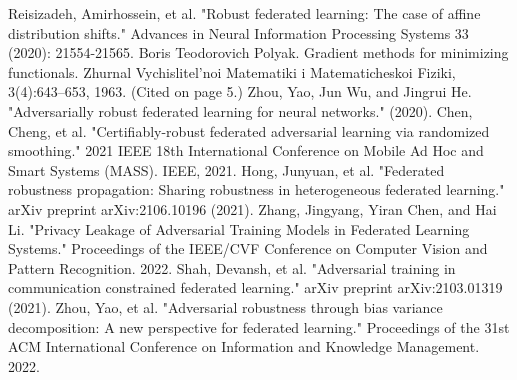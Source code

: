 \documentclass[conference]{IEEEtran}
\begin{document}
\begin{thebibliography}{00}
     Reisizadeh, Amirhossein, et al. "Robust federated learning: The case of affine distribution shifts." Advances in Neural Information Processing Systems 33 (2020): 21554-21565.
     Boris Teodorovich Polyak. Gradient methods for minimizing functionals. Zhurnal Vychislitel'noi Matematiki i Matematicheskoi Fiziki, 3(4):643–653, 1963. (Cited on page 5.)
     Zhou, Yao, Jun Wu, and Jingrui He. "Adversarially robust federated learning for neural networks." (2020).
     Chen, Cheng, et al. "Certifiably-robust federated adversarial learning via randomized smoothing." 2021 IEEE 18th International Conference on Mobile Ad Hoc and Smart Systems (MASS). IEEE, 2021.
     Hong, Junyuan, et al. "Federated robustness propagation: Sharing robustness in heterogeneous federated learning." arXiv preprint arXiv:2106.10196 (2021).
     Zhang, Jingyang, Yiran Chen, and Hai Li. "Privacy Leakage of Adversarial Training Models in Federated Learning Systems." Proceedings of the IEEE/CVF Conference on Computer Vision and Pattern Recognition. 2022.  
     Shah, Devansh, et al. "Adversarial training in communication constrained federated learning." arXiv preprint arXiv:2103.01319 (2021). 
     Zhou, Yao, et al. "Adversarial robustness through bias variance decomposition: A new perspective for federated learning." Proceedings of the 31st ACM International Conference on Information and Knowledge Management. 2022.

\end{thebibliography}
\end{document}

